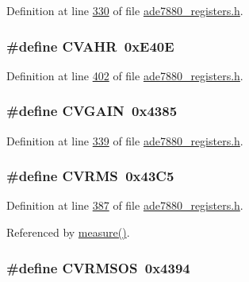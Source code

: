 Definition at line \hyperlink{a00036_source_l00330}{330} of file \hyperlink{a00036_source}{ade7880\-\_\-registers.\-h}.

\hypertarget{a00036_aa1b4960c4d08f67d76caa27f6dc7414f}{
\subsubsection[{C\-V\-A\-H\-R}]{\setlength{\rightskip}{0pt plus 5cm}\#define C\-V\-A\-H\-R~0x\-E40\-E}}\label{de/d8c/a00036_aa1b4960c4d08f67d76caa27f6dc7414f}


Definition at line \hyperlink{a00036_source_l00402}{402} of file \hyperlink{a00036_source}{ade7880\-\_\-registers.\-h}.

\hypertarget{a00036_a0920d5a91a9a5a8339d894c00cfecec7}{
\subsubsection[{C\-V\-G\-A\-I\-N}]{\setlength{\rightskip}{0pt plus 5cm}\#define C\-V\-G\-A\-I\-N~0x4385}}\label{de/d8c/a00036_a0920d5a91a9a5a8339d894c00cfecec7}


Definition at line \hyperlink{a00036_source_l00339}{339} of file \hyperlink{a00036_source}{ade7880\-\_\-registers.\-h}.

\hypertarget{a00036_a61e9291ce0829a45cee1ee9a5f3ea4f7}{
\subsubsection[{C\-V\-R\-M\-S}]{\setlength{\rightskip}{0pt plus 5cm}\#define C\-V\-R\-M\-S~0x43\-C5}}\label{de/d8c/a00036_a61e9291ce0829a45cee1ee9a5f3ea4f7}


Definition at line \hyperlink{a00036_source_l00387}{387} of file \hyperlink{a00036_source}{ade7880\-\_\-registers.\-h}.



Referenced by \hyperlink{a00042_source_l00040}{measure()}.

\hypertarget{a00036_a6e1bda3d471c0ed3ef337b2f5f1ee9d5}{
\subsubsection[{C\-V\-R\-M\-S\-O\-S}]{\setlength{\rightskip}{0pt plus 5cm}\#define C\-V\-R\-M\-S\-O\-S~0x4394}}\label{de/d8c/a00036_a6e1bda3d471c0ed3ef337b2f5f1ee9d5}



